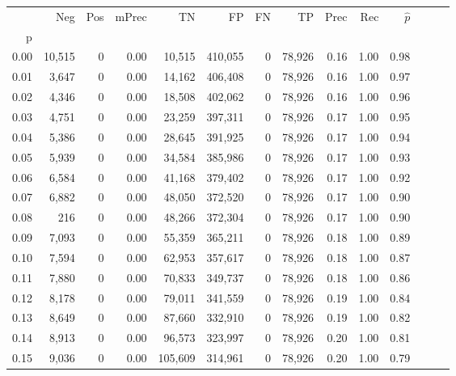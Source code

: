 \begin{tabular}{rrrrrrrrrrrrrr}
\toprule
{} &     Neg &    Pos & mPrec &       TN &       FP &      FN &      TP &  Prec &   Rec & $\hat{p}$ \\
p    &         &        &       &          &          &         &         &       &       &           \\
\midrule
0.00 &  10,515 &      0 &  0.00 &   10,515 &  410,055 &       0 &  78,926 &  0.16 &  1.00 &      0.98 \\
0.01 &   3,647 &      0 &  0.00 &   14,162 &  406,408 &       0 &  78,926 &  0.16 &  1.00 &      0.97 \\
0.02 &   4,346 &      0 &  0.00 &   18,508 &  402,062 &       0 &  78,926 &  0.16 &  1.00 &      0.96 \\
0.03 &   4,751 &      0 &  0.00 &   23,259 &  397,311 &       0 &  78,926 &  0.17 &  1.00 &      0.95 \\
0.04 &   5,386 &      0 &  0.00 &   28,645 &  391,925 &       0 &  78,926 &  0.17 &  1.00 &      0.94 \\
0.05 &   5,939 &      0 &  0.00 &   34,584 &  385,986 &       0 &  78,926 &  0.17 &  1.00 &      0.93 \\
0.06 &   6,584 &      0 &  0.00 &   41,168 &  379,402 &       0 &  78,926 &  0.17 &  1.00 &      0.92 \\
0.07 &   6,882 &      0 &  0.00 &   48,050 &  372,520 &       0 &  78,926 &  0.17 &  1.00 &      0.90 \\
0.08 &     216 &      0 &  0.00 &   48,266 &  372,304 &       0 &  78,926 &  0.17 &  1.00 &      0.90 \\
0.09 &   7,093 &      0 &  0.00 &   55,359 &  365,211 &       0 &  78,926 &  0.18 &  1.00 &      0.89 \\
0.10 &   7,594 &      0 &  0.00 &   62,953 &  357,617 &       0 &  78,926 &  0.18 &  1.00 &      0.87 \\
0.11 &   7,880 &      0 &  0.00 &   70,833 &  349,737 &       0 &  78,926 &  0.18 &  1.00 &      0.86 \\
0.12 &   8,178 &      0 &  0.00 &   79,011 &  341,559 &       0 &  78,926 &  0.19 &  1.00 &      0.84 \\
0.13 &   8,649 &      0 &  0.00 &   87,660 &  332,910 &       0 &  78,926 &  0.19 &  1.00 &      0.82 \\
0.14 &   8,913 &      0 &  0.00 &   96,573 &  323,997 &       0 &  78,926 &  0.20 &  1.00 &      0.81 \\
0.15 &   9,036 &      0 &  0.00 &  105,609 &  314,961 &       0 &  78,926 &  0.20 &  1.00 &      0.79 \\

\end{tabular}
